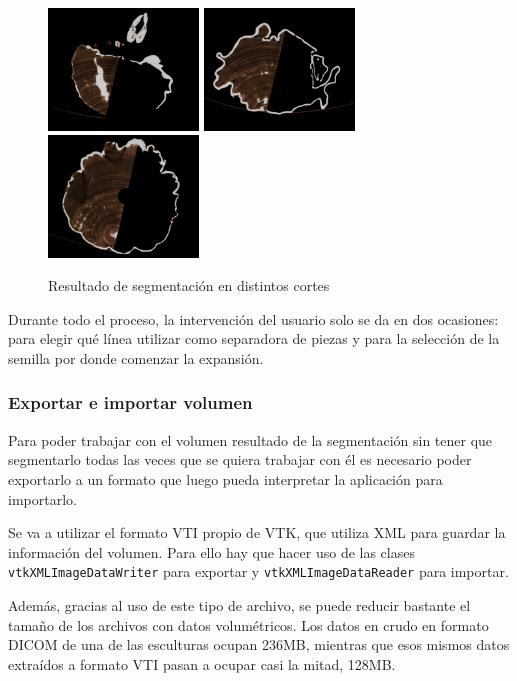 \begin{figure}[H]
	\centering
	\includegraphics[width=4cm]{imagenes/desarrollo/corte-segmentado-1}
	\includegraphics[width=4cm]{imagenes/desarrollo/corte-segmentado-2}
	\includegraphics[width=4cm]{imagenes/desarrollo/corte-segmentado-3}
	\caption{Resultado de segmentación en distintos cortes}
	\label{fig:desarrollo/ejemplos-segmentacion}
\end{figure}

Durante todo el proceso, la intervención del usuario solo se da en dos ocasiones: para elegir qué línea utilizar como separadora de piezas y para la selección de la semilla por donde comenzar la expansión.

\subsubsection{Exportar e importar volumen}

Para poder trabajar con el volumen resultado de la segmentación sin tener que segmentarlo todas las veces que se quiera trabajar con él es necesario poder exportarlo a un formato que luego pueda interpretar la aplicación para importarlo.

Se va a utilizar el formato VTI propio de VTK, que utiliza XML para guardar la información del volumen. Para ello hay que hacer uso de las clases \texttt{vtkXMLImageDataWriter} para exportar y \texttt{vtkXMLImageDataReader} para importar.

Además, gracias al uso de este tipo de archivo, se puede reducir bastante el tamaño de los archivos con datos volumétricos. Los datos en crudo en formato DICOM de una de las esculturas ocupan 236MB, mientras que esos mismos datos extraídos a formato VTI pasan a ocupar casi la mitad, 128MB.

